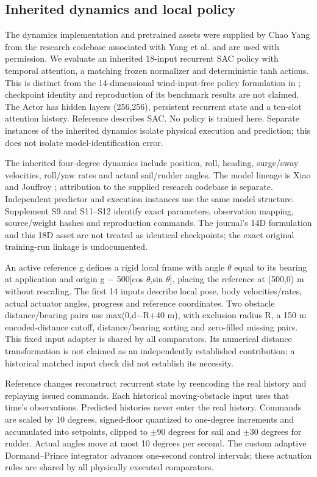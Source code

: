 \documentclass[conference]{IEEEtran}
\begin{document}
\subsection{Inherited dynamics and local policy}

The dynamics implementation and pretrained assets were supplied by Chao Yang from the research codebase associated with Yang et al. \cite{ref9} and are used with permission. We evaluate an inherited 18-input recurrent SAC policy with temporal attention, a matching frozen normalizer and deterministic tanh actions. This is distinct from the 14-dimensional wind-input-free policy formulation in \cite{ref9}; checkpoint identity and reproduction of its benchmark results are not claimed. The Actor has hidden layers (256,256), persistent recurrent state and a ten-slot attention history. Reference \cite{ref5} describes SAC. No policy is trained here. Separate instances of the inherited dynamics isolate physical execution and prediction; this does not isolate model-identification error.

The inherited four-degree dynamics include position, roll, heading, surge/sway velocities, roll/yaw rates and actual sail/rudder angles. The model lineage is Xiao and Jouffroy \cite{ref8}; attribution to the supplied research codebase \cite{ref9} is separate. Independent predictor and execution instances use the same model structure. Supplement S9 and S11--S12 identify exact parameters, observation mapping, source/weight hashes and reproduction commands. The journal's 14D formulation and this 18D asset are not treated as identical checkpoints; the exact original training-run linkage is undocumented.

An active reference g defines a rigid local frame with angle \ensuremath{\theta} equal to its bearing at application and origin g \ensuremath{-} 500[cos \ensuremath{\theta},sin \ensuremath{\theta}], placing the reference at (500,0) m without rescaling. The first 14 inputs describe local pose, body velocities/rates, actual actuator angles, progress and reference coordinates. Two obstacle distance/bearing pairs use max(0,d\ensuremath{-}R+40 m), with exclusion radius R, a 150 m encoded-distance cutoff, distance/bearing sorting and zero-filled missing pairs. This fixed input adapter is shared by all comparators. Its numerical distance transformation is not claimed as an independently established contribution; a historical matched input check did not establish its necessity.

Reference changes reconstruct recurrent state by reencoding the real history and replaying issued commands. Each historical moving-obstacle input uses that time's observations. Predicted histories never enter the real history. Commands are scaled by 10 degrees, signed-floor quantized to one-degree increments and accumulated into setpoints, clipped to \ensuremath{\pm}90 degrees for sail and \ensuremath{\pm}30 degrees for rudder. Actual angles move at most 10 degrees per second. The custom adaptive Dormand--Prince integrator advances one-second control intervals; these actuation rules are shared by all physically executed comparators.
\end{document}
